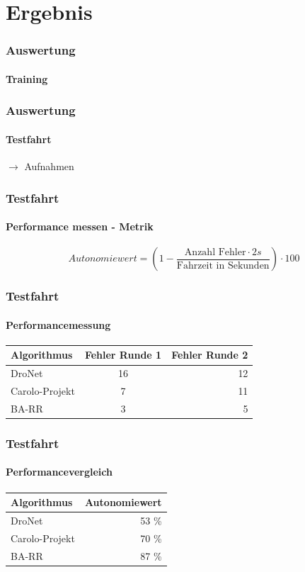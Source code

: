 \documentclass{beamer}
\begin{document}
\section{Ergebnis}
\frame{\tableofcontents[currentsection]}

\begin{frame}
\frametitle{Auswertung}
\framesubtitle{Training}

\end{frame}


\begin{frame}
\frametitle{Auswertung}
\framesubtitle{Testfahrt}

\centering
{\huge $\xrightarrow{}$} {\huge Aufnahmen} 

\end{frame}

\begin{frame}
\frametitle{Testfahrt}
\framesubtitle{Performance messen - Metrik}
\begin{equation}
Autonomiewert = (1 -  \frac{\text{Anzahl Fehler}\cdot 2 s}{\text{Fahrzeit in Sekunden}})\cdot 100
\end{equation}
\end{frame}

\begin{frame}
\frametitle{Testfahrt}
\framesubtitle{Performancemessung}

\begin{table}[h]
  \begin{center}
    \label{tab:testfahrten}
    \begin{tabular}{l|c|r} %
      \textbf{Algorithmus} & \textbf{Fehler Runde 1} & \textbf{Fehler Runde 2}\\
      \hline
      DroNet & 16 & 12\\
      Carolo-Projekt & 7 & 11\\
       BA-RR& 3 & 5\\
    \end{tabular}
  \end{center}
\end{table}

\end{frame}

\begin{frame}
\frametitle{Testfahrt}
\framesubtitle{Performancevergleich}

\begin{table}[h]
  \begin{center}
    \label{tab:autonomie}
    \begin{tabular}{l|r}
      \textbf{Algorithmus} & \textbf{Autonomiewert} \\
      \hline
      DroNet & 53 \% \\
      Carolo-Projekt & 70 \%  \\
       BA-RR& 87 \% \\
    \end{tabular}
  \end{center}
\end{table}

\end{frame}
\end{document}

